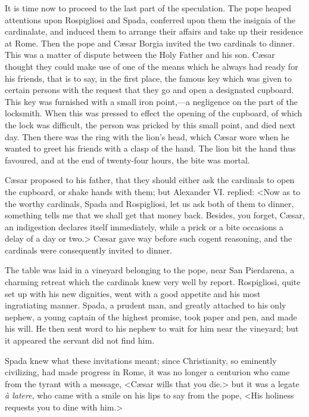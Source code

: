 {It is time now to proceed to the last part of the speculation. The pope heaped attentions upon Rospigliosi and Spada, conferred upon them the insignia of the cardinalate, and induced them to arrange their affairs and take up their residence at Rome. Then the pope and Cæsar Borgia invited the two cardinals to dinner. This was a matter of dispute between the Holy Father and his son. Cæsar thought they could make use of one of the means which he always had ready for his friends, that is to say, in the first place, the famous key which was given to certain persons with the request that they go and open a designated cupboard. This key was furnished with a small iron point,—a negligence on the part of the locksmith. When this was pressed to effect the opening of the cupboard, of which the lock was difficult, the person was pricked by this small point, and died next day. Then there was the ring with the lion's head, which Cæsar wore when he wanted to greet his friends with a clasp of the hand. The lion bit the hand thus favoured, and at the end of twenty-four hours, the bite was mortal. 

Cæsar proposed to his father, that they should either ask the cardinals to open the cupboard, or shake hands with them; but Alexander VI. replied: <Now as to the worthy cardinals, Spada and Rospigliosi, let us ask both of them to dinner, something tells me that we shall get that money back. Besides, you forget, Cæsar, an indigestion declares itself immediately, while a prick or a bite occasions a delay of a day or two.> Cæsar gave way before such cogent reasoning, and the cardinals were consequently invited to dinner. 

The table was laid in a vineyard belonging to the pope, near San Pierdarena, a charming retreat which the cardinals knew very well by report. Rospigliosi, quite set up with his new dignities, went with a good appetite and his most ingratiating manner. Spada, a prudent man, and greatly attached to his only nephew, a young captain of the highest promise, took paper and pen, and made his will. He then sent word to his nephew to wait for him near the vineyard; but it appeared the servant did not find him. 

Spada knew what these invitations meant; since Christianity, so eminently civilizing, had made progress in Rome, it was no longer a centurion who came from the tyrant with a message, <Cæsar wills that you die.> but it was a legate \textit{à latere}, who came with a smile on his lips to say from the pope, <His holiness requests you to dine with him.> 

}
